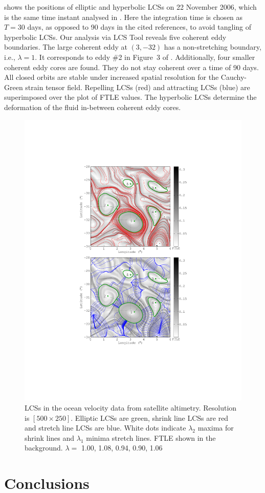 \documentclass[5p]{elsarticle}
\begin{document}
 shows the positions of elliptic and hyperbolic LCSs on 22 November 2006, which is the same time instant analysed in \citet{haller13:_coher_lagran,haller14:_adden_coher_lagran,beron-vera13:_objec_agulh}. Here the integration time is chosen as $T = 30$ days, as opposed to 90 days in the cited references, to avoid tangling of hyperbolic LCSs. Our analysis via LCS Tool reveals five coherent eddy boundaries. The large coherent eddy at $(3,-32)$ has a non-stretching boundary, i.e., $\lambda = 1$. It corresponds to eddy \#2 in Figure~3 of \citet{beron-vera13:_objec_agulh}. Additionally, four smaller coherent eddy cores are found. They do not stay coherent over a time of 90 days. All closed orbits are stable under increased spatial resolution for the Cauchy-Green strain tensor field. Repelling LCSs (red) and attracting LCSs (blue) are superimposed over the plot of FTLE values. The hyperbolic LCSs determine the deformation of the fluid in-between coherent eddy cores.

\begin{figure}
\begin{center}
\includegraphics[width=.475\textwidth]{graphics/ocean_dataset/lambda_hyperbolic_lcs}
\end{center}
\caption{
LCSs in the ocean velocity data from satellite altimetry.
Resolution is $[500\times250]$.
Elliptic LCSs are green, shrink line LCSs are red and stretch line LCSs are blue.
White dots indicate $\lambda_2$ maxima for shrink lines and $\lambda_1$ minima stretch lines.
FTLE shown in the background.
$\lambda=$ 1.00, 1.08, 0.94, 0.90, 1.06
}
\label{f:ocean dataset LCS}
\end{figure}

\section{Conclusions}
\end{document}
